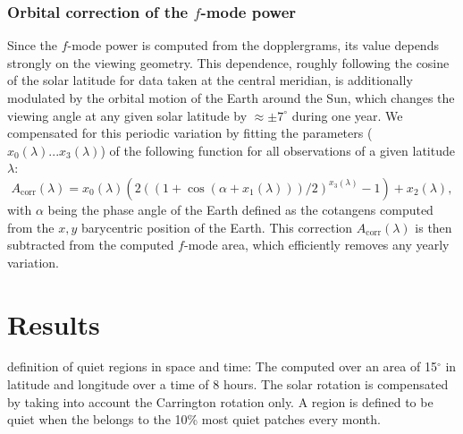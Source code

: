 \documentclass{aa}
\begin{document}
\subsubsection*{Orbital correction of the $f$-mode power}

Since the $f$-mode power is computed from the \los{} dopplergrams, its value depends strongly on the viewing geometry. This dependence,  roughly following the cosine of the solar latitude for data taken at the central meridian, is additionally modulated by the orbital motion of the Earth around the Sun, which changes the viewing angle at any given solar latitude by $\approx\pm7^\circ$ during one year. We compensated for this periodic variation by fitting the parameters ($x_0(\lambda)...x_3(\lambda)$) of the following function for all observations of a given latitude $\lambda$:
\begin{equation}
\label{eq:orbitcorr}
A_{\mbox{corr}}(\lambda) = x_0(\lambda) (  2 ( (1+\cos(\alpha+x_1(\lambda)))/2)^{x_3(\lambda)}-1   )+ x_2(\lambda),
\end{equation}
with $\alpha$ being the phase angle of the Earth defined as the cotangens computed from the $x,y$ barycentric position of the Earth.
This correction $A_{\mbox{corr}}(\lambda)$ is then subtracted from the computed $f$-mode area, which efficiently removes any yearly variation. 

\section{Results}





definition of quiet regions in space and time: 
The \brms{} computed over an area of 15$^\circ$ in latitude and longitude over a time of 8 hours. The solar rotation is compensated by taking into account the Carrington rotation only. A region is defined to be quiet when the \brms{} belongs to the 10\% most quiet patches every month.


\end{document}
